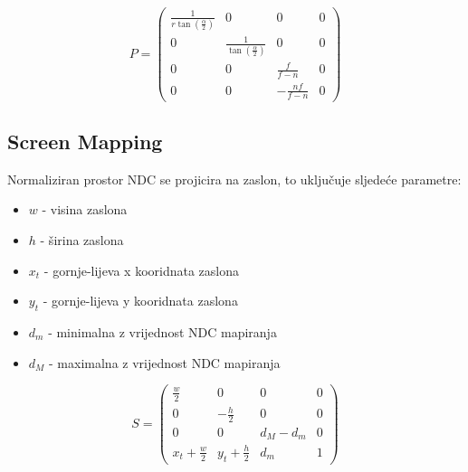 \[
P =
\begin{pmatrix}
\frac{1}{r \tan(\frac{\alpha}{2})} & 0 & 0 & 0\\
0 & \frac{1}{\tan(\frac{\alpha}{2})} & 0 & 0\\
0 & 0 & \frac{f}{f-n} & 0\\
0 & 0 & -\frac{nf}{f-n} & 0
\end{pmatrix}
\]

\pagebreak

\begin{codesection}
	
\end{codesection}

\subsection{Screen Mapping}

Normaliziran prostor NDC se projicira na zaslon, to uključuje sljedeće parametre:
\begin{itemize}
\item $w$ - visina zaslona
\item $h$ - širina zaslona
\item $x_t$ - gornje-lijeva x kooridnata zaslona
\item $y_t$ - gornje-lijeva y kooridnata zaslona
\item $d_m$ - minimalna z vrijednost NDC mapiranja
\item $d_M$ - maximalna z vrijednost NDC mapiranja
\end{itemize}

\[
S =
\begin{pmatrix}
\frac{w}{2} & 0 & 0 & 0\\
0 & -\frac{h}{2} & 0 & 0\\
0 & 0 & d_M - d_m & 0\\
x_t + \frac{w}{2} & y_t + \frac{h}{2} & d_m & 1
\end{pmatrix}
\]

\begin{codesection}
	
\end{codesection}

\pagebreak

\begin{codesection}
	
\end{codesection}


